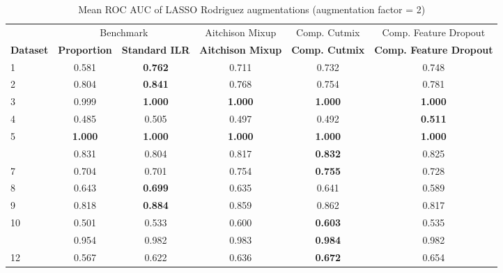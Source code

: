 \begin{table}[!h]
\centering
\caption{\label{tab:tab:rodriguez_lasso_mean_roc_auc_2}Mean ROC AUC of LASSO Rodriguez augmentations (augmentation factor = 2)}
\centering
\begin{tabular}[t]{lccccc}
\toprule
\multicolumn{1}{c}{ } & \multicolumn{2}{c}{Benchmark} & \multicolumn{1}{c}{Aitchison Mixup} & \multicolumn{1}{c}{Comp. Cutmix} & \multicolumn{1}{c}{Comp. Feature Dropout} \\
\cmidrule(l{3pt}r{3pt}){2-3} \cmidrule(l{3pt}r{3pt}){4-4} \cmidrule(l{3pt}r{3pt}){5-5} \cmidrule(l{3pt}r{3pt}){6-6}
\textbf{Dataset} & \textbf{Proportion} & \textbf{Standard ILR} & \textbf{Aitchison Mixup} & \textbf{Comp. Cutmix} & \textbf{Comp. Feature Dropout}\\
\midrule
1 & 0.581 & \textbf{0.762} & 0.711 & 0.732 & 0.748\\
2 & 0.804 & \textbf{0.841} & 0.768 & 0.754 & 0.781\\
3 & 0.999 & \textbf{1.000} & \textbf{1.000} & \textbf{1.000} & \textbf{1.000}\\
4 & 0.485 & 0.505 & 0.497 & 0.492 & \textbf{0.511}\\
5 & \textbf{1.000} & \textbf{1.000} & \textbf{1.000} & \textbf{1.000} & \textbf{1.000}\\
\addlinespace
6 & 0.831 & 0.804 & 0.817 & \textbf{0.832} & 0.825\\
7 & 0.704 & 0.701 & 0.754 & \textbf{0.755} & 0.728\\
8 & 0.643 & \textbf{0.699} & 0.635 & 0.641 & 0.589\\
9 & 0.818 & \textbf{0.884} & 0.859 & 0.862 & 0.817\\
10 & 0.501 & 0.533 & 0.600 & \textbf{0.603} & 0.535\\
\addlinespace
11 & 0.954 & 0.982 & 0.983 & \textbf{0.984} & 0.982\\
12 & 0.567 & 0.622 & 0.636 & \textbf{0.672} & 0.654\\
\bottomrule
\end{tabular}
\end{table}
